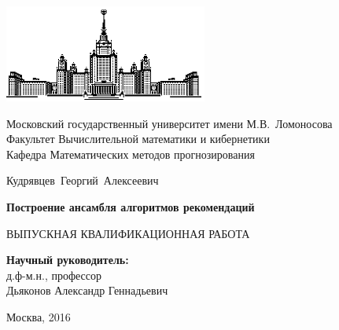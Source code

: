 \documentclass[14pt]{extarticle}
\begin{document}
\begingroup
\fontsize{12pt}{12pt}\selectfont
\begin{titlepage}
\begin{center}
 
 
   \includegraphics[width=0.5\textwidth]{msu}
   
   Московский государственный университет имени М.В.~Ломоносова\\
   Факультет Вычислительной математики и кибернетики\\
   Кафедра Математических методов прогнозирования
   
    \vspace{5cm}
    {\Large Кудрявцев~Георгий~Алексеевич}  
    \vspace{1cm}
   
    {\Large\bfseries
    Построение ансамбля алгоритмов рекомендаций\\}
   
    \vspace{1cm}
   
    {\large ВЫПУСКНАЯ КВАЛИФИКАЦИОННАЯ РАБОТА}
 
    \vfill
   
    \begin{flushright}
      \textbf{Научный руководитель:}\\
      д.ф-м.н., профессор\\
      Дьяконов Александр Геннадьевич
    \end{flushright}
 
   \vspace{\fill}
   Москва, 2016
\end{center}
\end{titlepage}
\endgroup

\newpage
\end{document}
